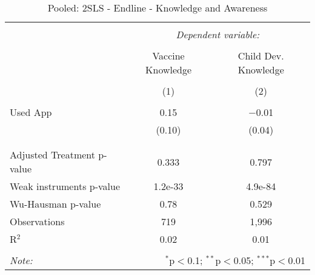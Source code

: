
\begin{table}[!htbp] \centering 
  \caption{Pooled: 2SLS - Endline - Knowledge and Awareness} 
  \label{tbl:Pooled: 2SLS - Endline - Knowledge and Awareness} 
\begin{tabular}{@{\extracolsep{5pt}}lcc} 
\\[-1.8ex]\hline 
\hline \\[-1.8ex] 
 & \multicolumn{2}{c}{\textit{Dependent variable:}} \\ 
\cline{2-3} 
\\[-1.8ex] & Vaccine Knowledge & Child Dev. Knowledge \\ 
\\[-1.8ex] & (1) & (2)\\ 
\hline \\[-1.8ex] 
 Used App & 0.15 & $-$0.01 \\ 
  & (0.10) & (0.04) \\ 
  & & \\ 
\hline \\[-1.8ex] 
Adjusted Treatment p-value & 0.333 & 0.797 \\ 
Weak instruments p-value & 1.2e-33 & 4.9e-84 \\ 
Wu-Hausman p-value & 0.78 & 0.529 \\ 
Observations & 719 & 1,996 \\ 
R$^{2}$ & 0.02 & 0.01 \\ 
\hline 
\hline \\[-1.8ex] 
\textit{Note:}  & \multicolumn{2}{r}{$^{*}$p$<$0.1; $^{**}$p$<$0.05; $^{***}$p$<$0.01} \\ 
\end{tabular} 
\end{table} 
